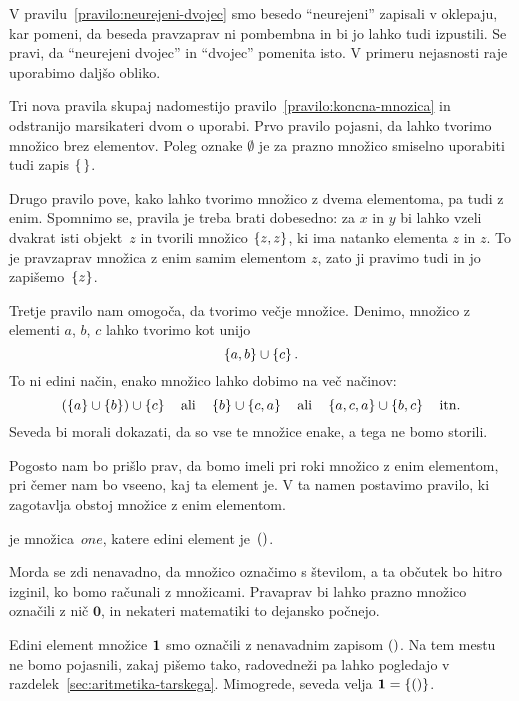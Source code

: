 V pravilu~\ref{pravilo:neurejeni-dvojec} smo besedo ``neurejeni'' zapisali v oklepaju, kar
pomeni, da beseda pravzaprav ni pombembna in bi jo lahko tudi izpustili. Se pravi, da
``neurejeni dvojec'' in ``dvojec'' pomenita isto. V primeru nejasnosti raje uporabimo
daljšo obliko.

Tri nova pravila skupaj nadomestijo pravilo~\ref{pravilo:koncna-mnozica} in odstranijo
marsikateri dvom o uporabi. Prvo pravilo pojasni, da lahko tvorimo množico brez elementov.
Poleg oznake $\emptyset$ je za prazno množico smiselno uporabiti tudi zapis $\set{\,}$.

Drugo pravilo pove, kako lahko tvorimo množico z dvema elementoma, pa tudi z enim.
Spomnimo se, pravila je treba brati dobesedno: za $x$ in $y$ bi lahko vzeli dvakrat isti
objekt~$z$ in tvorili množico $\set{z, z}$, ki ima natanko elementa $z$ in $z$. To je
pravzaprav množica z enim samim elementom $z$, zato ji pravimo tudi  in jo
zapišemo~$\set{z}$.

Tretje pravilo nam omogoča, da tvorimo večje množice. Denimo, množico z elementi $a$, $b$,
$c$ lahko tvorimo kot unijo
%
\begin{equation*}
  \set{a, b} \cup \set{c}.
\end{equation*}
%
To ni edini način, enako množico lahko dobimo na več načinov:
%
\begin{equation*}
  (\set{a} \cup \set{b}) \cup \set{c}
  \quad\text{ali}\quad
  \set{b} \cup \set{c, a}
  \quad\text{ali}\quad
  \set{a,c,a} \cup \set{b,c}
  \quad\text{itn.}
\end{equation*}
%
Seveda bi morali dokazati, da so vse te množice enake, a tega ne bomo storili.

Pogosto nam bo prišlo prav, da bomo imeli pri roki množico z enim elementom, pri čemer nam
bo vseeno, kaj ta element je. V ta namen postavimo pravilo, ki zagotavlja obstoj množice z
enim elementom.

\begin{pravilo}
  \label{pravilo:enojec}
   je množica~$one$, katere edini element je~$\mathord{()}$.
\end{pravilo}

Morda se zdi nenavadno, da množico označimo s številom, a ta občutek bo hitro izginil, ko
bomo računali z množicami. Pravaprav bi lahko prazno množico označili z nič $\mathbf{0}$,
in nekateri matematiki to dejansko počnejo.

Edini element množice $\mathtt{\mathbf{1}}$ smo označili z nenavadnim zapisom $\mathord{()}$. Na tem mestu ne
bomo pojasnili, zakaj pišemo tako, radovedneži pa lahko pogledajo v
razdelek~\ref{sec:aritmetika-tarskega}. Mimogrede, seveda velja $\one = \set{\unit}$.

